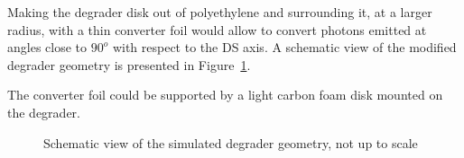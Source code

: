Making the degrader disk out of polyethylene and surrounding it, at a larger radius, 
with a thin converter foil would allow to convert photons emitted at angles close to $90^o$
with respect to the DS axis. A schematic view of the modified degrader geometry is presented in Figure~\ref{figure:degrader_geometry_v3}.

The converter foil could be supported by a light carbon foam disk mounted on the degrader.

\begin{figure}[H]
  \caption{
    \label{figure:degrader_geometry_v3}
    Schematic view of the simulated degrader geometry, not up to scale
  }
\end{figure}


